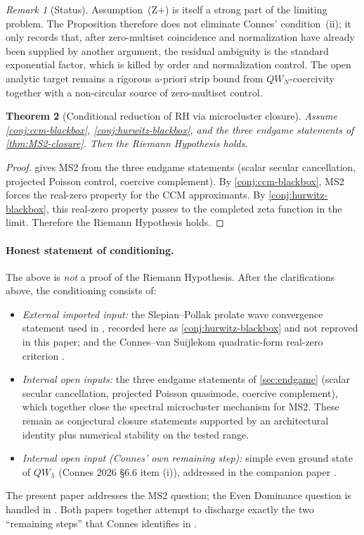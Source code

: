 \documentclass[12pt,a4paper]{article}
\newtheorem{theorem}{Theorem}[section]
\theoremstyle{definition}
\theoremstyle{remark}
\newtheorem{remark}[theorem]{Remark}
\begin{document}
\begin{remark}[Status]
Assumption~(Z+) is itself a strong part of the limiting problem.  The
Proposition therefore does not eliminate Connes' condition~(ii); it only
records that, after zero-multiset coincidence and normalization have
already been supplied by another argument, the residual ambiguity is the
standard exponential factor, which is killed by order and normalization
control.  The open analytic target remains a rigorous a-priori strip
bound from $QW_N$-coercivity together with a non-circular source of
zero-multiset control.
\end{remark}

\begin{theorem}[Conditional reduction of RH via microcluster closure]
\label{thm:RH-conditional}
Assume \cref{conj:ccm-blackbox}, \cref{conj:hurwitz-blackbox}, and the
three endgame statements of \cref{thm:MS2-closure}.  Then the Riemann
Hypothesis holds.
\end{theorem}

\begin{proof}
 gives MS2 from the three endgame statements
(scalar secular cancellation, projected Poisson control, coercive
complement).  By \cref{conj:ccm-blackbox}, MS2 forces the real-zero
property for the CCM approximants.  By \cref{conj:hurwitz-blackbox},
this real-zero property passes to the completed zeta function in the
limit.  Therefore the Riemann Hypothesis holds.
\end{proof}

\paragraph{Honest statement of conditioning.}  The above is
\emph{not} a proof of the Riemann Hypothesis.  After the
clarifications above, the conditioning consists of:
\begin{itemize}[leftmargin=*]
  \item \emph{External imported input:} the Slepian--Pollak prolate
    wave convergence statement used in \cite[Fact 6.4 / Theorem~1 of
    Ref.~47]{Connes2026}, recorded here as
    \cref{conj:hurwitz-blackbox} and not reproved in this paper; and
    the Connes--van Suijlekom quadratic-form real-zero criterion
    \cite{ConnesvS2025}.
  \item \emph{Internal open inputs:} the three endgame statements of
    \cref{sec:endgame} (scalar secular cancellation, projected Poisson
    quasimode, coercive complement), which together close the spectral
    microcluster mechanism for MS2.  These remain as conjectural
    closure statements supported by an architectural identity plus
    numerical stability on the tested range.
  \item \emph{Internal open input (Connes' own remaining step):}
    simple even ground state of $QW_\lambda$ (Connes 2026 §6.6 item
    (i)), addressed in the companion paper \cite{Geiger2026evendom}.
\end{itemize}
The present paper addresses the MS2 question; the Even Dominance
question is handled in \cite{Geiger2026evendom}.  Both papers
together attempt to discharge exactly the two ``remaining steps'' that
Connes identifies in \cite[§6.6]{Connes2026}.
\end{document}
